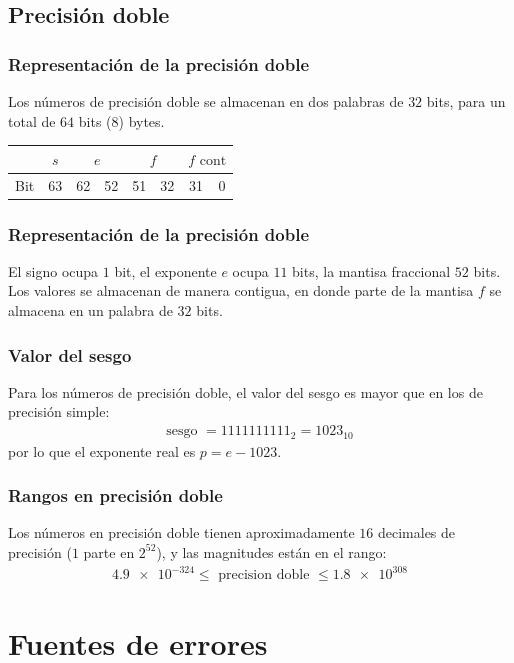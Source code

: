 \documentclass[12pt]{beamer}
\begin{document}
\subsection{Precisión doble}

\begin{frame}
\frametitle{Representación de la precisión doble}
Los números de precisión doble se almacenan en dos palabras de $32$ bits, para un total de $64$ bits ($8$) bytes.
\pause
\begin{table}
\fontsize{12}{12}\selectfont
\begin{tabular}{ l | c | c | c | c | c | c | c |}
\cline{2-8}
 {} & $s$ & \multicolumn{2}{c|}{$e$} & \multicolumn{2}{c|}{$f$} & \multicolumn{2}{c|}{$f \text{ cont}$} \\ \hline
 Bit & 63 & 62 & 52 & 51 & 32 & 31 & 0 \\ \hline
\end{tabular}
\end{table}
\end{frame}
\begin{frame}
\frametitle{Representación de la precisión doble}
El signo ocupa $1$ bit, el exponente $e$ ocupa $11$ bits, la mantisa fraccional $52$ bits.
\\
\bigskip
\pause
Los valores se almacenan de manera contigua, en donde parte de la mantisa $f$ se almacena en un palabra de $32$ bits.
\end{frame}
\begin{frame}
\frametitle{Valor del sesgo}
Para los números de precisión doble, el valor del sesgo es mayor que en los de precisión simple:
\pause
\begin{align*}
\text{sesgo } = 1111111111_{2} = 1023_{10}
\end{align*}
por lo que el exponente real es $p = e - 1023$.
\end{frame}
\begin{frame}
\frametitle{Rangos en precisión doble}
Los números en precisión doble tienen aproximadamente $16$ decimales de precisión ($1$ parte en $2^{52}$), y las magnitudes están en el rango:
\pause
\begin{align*}
\num{4.9e-324} \leq \text{ precision doble } \leq \num{1.8e308}
\end{align*}
\end{frame}

\section{Fuentes de errores}
\end{document}
